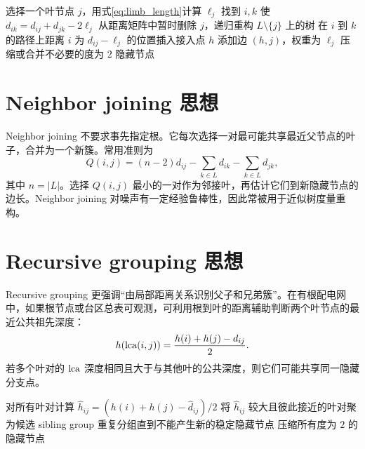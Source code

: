 \begin{algorithm}[htbp]
  \caption{简化 Additive Phylogeny 递归框架}
  \label{alg:additive_phylogeny}
  选择一个叶节点 $j$，用式\eqref{eq:limb_length}计算 $\ell_j$\;
  找到 $i,k$ 使 $d_{ik}=d_{ij}+d_{jk}-2\ell_j$\;
  从距离矩阵中暂时删除 $j$，递归重构 $L\setminus\{j\}$ 上的树\;
  在 $i$ 到 $k$ 的路径上距离 $i$ 为 $d_{ij}-\ell_j$ 的位置插入接入点 $h$\;
  添加边 $(h,j)$，权重为 $\ell_j$\;
  压缩或合并不必要的度为 $2$ 隐藏节点\;
\end{algorithm}

\section{Neighbor joining 思想}

Neighbor joining 不要求事先指定根。它每次选择一对最可能共享最近父节点的叶子，合并为一个新簇。常用准则为
\begin{equation}
  Q(i,j)=(n-2)d_{ij}-\sum_{k\in L}d_{ik}-\sum_{k\in L}d_{jk},
\end{equation}
其中 $n=|L|$。选择 $Q(i,j)$ 最小的一对作为邻接叶，再估计它们到新隐藏节点的边长。Neighbor joining 对噪声有一定经验鲁棒性，因此常被用于近似树度量重构。

\section{Recursive grouping 思想}

Recursive grouping 更强调“由局部距离关系识别父子和兄弟簇”。在有根配电网中，如果根节点或台区总表可观测，可利用根到叶的距离辅助判断两个叶节点的最近公共祖先深度：
\begin{equation}
  h(\operatorname{lca}(i,j))=\frac{h(i)+h(j)-d_{ij}}{2}.
  \label{eq:lca_from_distance}
\end{equation}
若多个叶对的 $\operatorname{lca}$ 深度相同且大于与其他叶的公共深度，则它们可能共享同一隐藏分支点。

\begin{algorithm}[htbp]
  \caption{面向配电网的简化 recursive grouping}
  \label{alg:recursive_grouping}
  对所有叶对计算 $\widehat h_{ij}=(h(i)+h(j)-\widehat d_{ij})/2$\;
  将 $\widehat h_{ij}$ 较大且彼此接近的叶对聚为候选 sibling group\;
  重复分组直到不能产生新的稳定隐藏节点\;
  压缩所有度为 $2$ 的隐藏节点\;
\end{algorithm}


